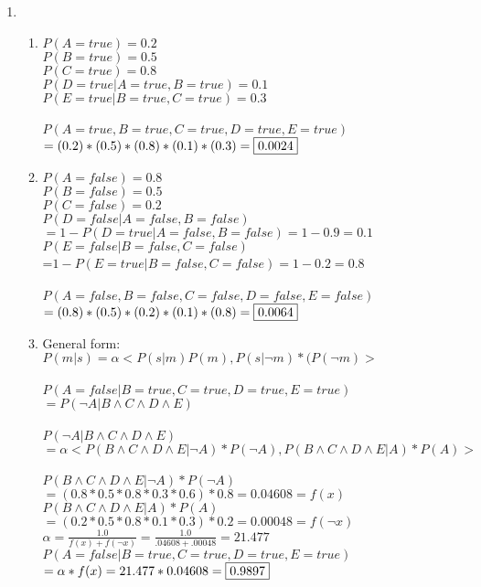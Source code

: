 \documentclass[12pt,a4paper]{report}
\begin{document}
\begin{enumerate}
\pagebreak
\item
\begin{enumerate}
	\item
	$P(A=true)=0.2$\\
	$P(B=true)=0.5$\\
	$P(C=true)=0.8$\\
	$P(D=true | A=true, B=true)=0.1$\\
	$P(E=true|B=true, C=true)=0.3$\\ \\
	$P(A=true,B=true,C=true,D=true,E=true)$\\$=(0.2)*(0.5)*(0.8)*(0.1)*(0.3) = \fbox{0.0024}$
	\item
	$P(A=false)=0.8$\\
	$P(B=false)=0.5$\\
	$P(C=false)=0.2$\\
	$P(D=false|A=false,B=false)$\\$=1-P(D=true|A=false,B=false)=1-0.9=0.1$\\
	$P(E=false|B=false,C=false)$\\=$1-P(E=true|B=false,C=false)=1-0.2=0.8$\\ \\
	$P(A=false, B=false, C=false, D=false, E=false)$\\ $=(0.8)*(0.5)*(0.2)*(0.1)*(0.8) = \fbox{0.0064}$
	\item
	General form: $P(m|s)=\alpha <P(s|m)P(m),P(s|\neg m)*(P(\neg m)>$\\ \\
	$P(A=false|B=true,C=true,D=true,E=true)$\\$=P(\neg A| B \wedge C \wedge D \wedge E)$\\ \\
	$P(\neg A| B \wedge C \wedge D \wedge E)$\\$=\alpha <P(B \wedge C \wedge D \wedge E|\neg A)*P(\neg A),P(B \wedge C \wedge D \wedge E|A)*P(A)>$\\ \\
	$P(B \wedge C \wedge D \wedge E|\neg A)*P(\neg A)$\\$ = (0.8*0.5*0.8*0.3*0.6)*0.8 = 0.04608 = f(x)$\\
	$P(B \wedge C \wedge D \wedge E|A)*P(A) $\\$= (0.2*0.5*0.8*0.1*0.3)*0.2 = 0.00048 = f(\neg x)$\\
	$\alpha = \frac{1.0}{f(x)+f(\neg x)}=\frac{1.0}{.04608+.00048} = 21.477$\\
	$P(A=false|B=true,C=true,D=true,E=true)$\\$ = \alpha * f(x) = 21.477 * 0.04608=\fbox{0.9897}$


\end{enumerate}
\end{enumerate}
\end{document}
